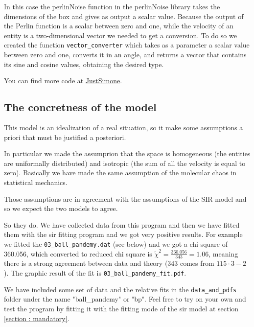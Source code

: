   In this case the perlinNoise function in the perlinNoise library takes the dimensions of the box and gives as output a scalar value.
  Because the output of the Perlin function is a scalar between zero and one, while the velocity of an entity is a two-dimensional vector we needed to get a conversion. To do so we created the function \verb|vector_converter| which takes as a parameter a scalar value between zero and one, converts it in an angle, and returns a vector that contains its sine and cosine values, obtaining the desired type.

You can find more code at \href{https://github.com/JustSimone}{JustSimone}.

\subsection{The concretness of the model}

This model is an idealization of a real situation, so it make some assumptions a priori that must be justified a posteriori.

In particular we made the assumprion that the space is homogeneous (the entities are uniformally distributed) and isotropic (the sum of all the velocity is equal to zero). Basically we have made the same assumption of the molecular chaos in statistical mechanics.

Those assumptions are in agreement with the assumptions of the SIR model and so we expect the two models to agree.

So they do. We have collected data from this program and then we have fitted them with the sir fitting program and we got very positive results. For example we fitted the \verb!03_ball_pandemy.dat! (see below) and we got a  chi square of 360.056, which converted to reduced chi square is $\tilde{\chi}^2 = \frac{360.056}{343} = 1.06$, meaning there is a strong agreement between data and theory (343 comes from $115 \cdot 3 - 2$). The graphic result of the fit is \verb!03_ball_pandemy_fit.pdf!.

We have included some set of data and the relative fits in the \verb!data_and_pdfs! folder under the name "ball\_pandemy" or "bp". Feel free to try on your own and test the program by fitting it with the fitting mode of the sir model at section \ref{section : mandatory}.



